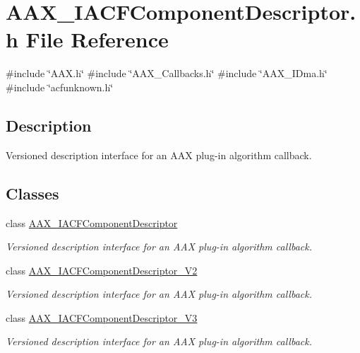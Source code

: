 \hypertarget{a00512}{}\section{A\+A\+X\+\_\+\+I\+A\+C\+F\+Component\+Descriptor.\+h File Reference}
\label{a00512}
{\ttfamily \#include \char`\"{}A\+A\+X.\+h\char`\"{}}\newline
{\ttfamily \#include \char`\"{}A\+A\+X\+\_\+\+Callbacks.\+h\char`\"{}}\newline
{\ttfamily \#include \char`\"{}A\+A\+X\+\_\+\+I\+Dma.\+h\char`\"{}}\newline
{\ttfamily \#include \char`\"{}acfunknown.\+h\char`\"{}}\newline


\subsection{Description}
Versioned description interface for an A\+AX plug-\/in algorithm callback. 

\subsection*{Classes}
\begin{DoxyCompactItemize}
\item 
class \mbox{\hyperlink{a01625}{A\+A\+X\+\_\+\+I\+A\+C\+F\+Component\+Descriptor}}
\begin{DoxyCompactList}\small\item\em Versioned description interface for an A\+AX plug-\/in algorithm callback. \end{DoxyCompactList}\item 
class \mbox{\hyperlink{a01629}{A\+A\+X\+\_\+\+I\+A\+C\+F\+Component\+Descriptor\+\_\+\+V2}}
\begin{DoxyCompactList}\small\item\em Versioned description interface for an A\+AX plug-\/in algorithm callback. \end{DoxyCompactList}\item 
class \mbox{\hyperlink{a01633}{A\+A\+X\+\_\+\+I\+A\+C\+F\+Component\+Descriptor\+\_\+\+V3}}
\begin{DoxyCompactList}\small\item\em Versioned description interface for an A\+AX plug-\/in algorithm callback. \end{DoxyCompactList}\end{DoxyCompactItemize}
